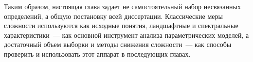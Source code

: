 Таким образом, настоящая глава задает не самостоятельный набор несвязанных определений, а общую постановку всей диссертации.
Классические меры сложности используются как исходные понятия, ландшафтные и спектральные характеристики~--- как основной инструмент анализа параметрических моделей, а достаточный объем выборки и методы снижения сложности~--- как способы проверить и использовать этот аппарат в последующих главах.

